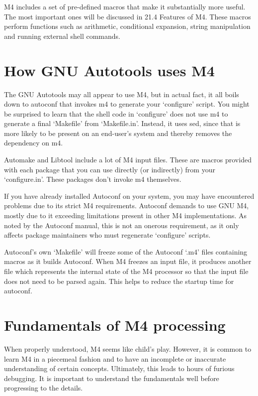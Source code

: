 M4 includes a set of pre-defined macros that make it substantially more useful. The most important ones will be discussed in 21.4 Features of M4. These macros perform functions such as arithmetic, conditional expansion, string manipulation and running external shell commands. 

\section{How GNU Autotools uses M4}

The GNU Autotools may all appear to use M4, but in actual fact, it all boils down to autoconf that invokes m4 to generate your `configure' script. You might be surprised to learn that the shell code in `configure' does not use m4 to generate a final `Makefile' from `Makefile.in'. Instead, it uses sed, since that is more likely to be present on an end-user's system and thereby removes the dependency on m4.

Automake and Libtool include a lot of M4 input files. These are macros provided with each package that you can use directly (or indirectly) from your `configure.in'. These packages don't invoke m4 themselves.

If you have already installed Autoconf on your system, you may have encountered problems due to its strict M4 requirements. Autoconf demands to use GNU M4, mostly due to it exceeding limitations present in other M4 implementations. As noted by the Autoconf manual, this is not an onerous requirement, as it only affects package maintainers who must regenerate `configure' scripts.

Autoconf's own `Makefile' will freeze some of the Autoconf `.m4' files containing macros as it builds Autoconf. When M4 freezes an input file, it produces another file which represents the internal state of the M4 processor so that the input file does not need to be parsed again. This helps to reduce the startup time for autoconf. 

\section{Fundamentals of M4 processing}\label{S_Fundamentals_of_M4_processing}

When properly understood, M4 seems like child's play. However, it is common to learn M4 in a piecemeal fashion and to have an incomplete or inaccurate understanding of certain concepts. Ultimately, this leads to hours of furious debugging. It is important to understand the fundamentals well before progressing to the details. 

